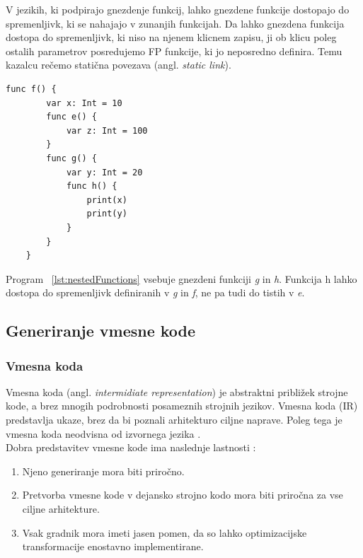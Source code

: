 \documentclass[a4paper, 12p]{book}
\begin{document}
V jezikih, ki podpirajo gnezdenje funkcij, lahko gnezdene funkcije dostopajo do spremenljivk, ki se nahajajo v zunanjih funkcijah. Da lahko gnezdena funkcija dostopa do spremenljivk, ki niso na njenem klicnem zapisu, ji ob klicu poleg ostalih parametrov posredujemo FP funkcije, ki jo neposredno definira. Temu kazalcu rečemo statična povezava (angl. \textit{static link}). 

\renewcommand{\lstlistingname}{Program}
\begin{lstlisting}[caption={Primer gnezdenih funkcij.}, captionpos=b, label={lst:nestedFunctions}]
    func f() {
        var x: Int = 10
        func e() {
            var z: Int = 100
        }
        func g() {
            var y: Int = 20
            func h() {
                print(x)
                print(y)
            }
        }
    }
\end{lstlisting}

Program ~\ref{lst:nestedFunctions} vsebuje gnezdeni funkciji \textit{g} in \textit{h}. Funkcija h lahko dostopa do spremenljivk definiranih v \textit{g} in \textit{f}, ne pa tudi do tistih v \textit{e}.

\subsection{Generiranje vmesne kode}   

\subsubsection{Vmesna koda}

Vmesna koda (angl. \textit{intermidiate representation}) je abstraktni približek strojne kode, a brez mnogih podrobnosti posameznih strojnih jezikov. Vmesna koda (IR) predstavlja ukaze, brez da bi poznali arhitekturo ciljne naprave. Poleg tega je vmesna koda neodvisna od izvornega jezika \cite{modernCompiler}. \\
\indent Dobra predstavitev vmesne kode ima naslednje lastnosti \cite{modernCompiler}:

\begin{enumerate}
	\item Njeno generiranje mora biti priročno.
	\item Pretvorba vmesne kode v dejansko strojno kodo mora biti priročna za vse ciljne arhitekture.
	\item Vsak gradnik mora imeti jasen pomen, da so lahko optimizacijske transformacije enostavno implementirane.
\end{enumerate}
\end{document}
